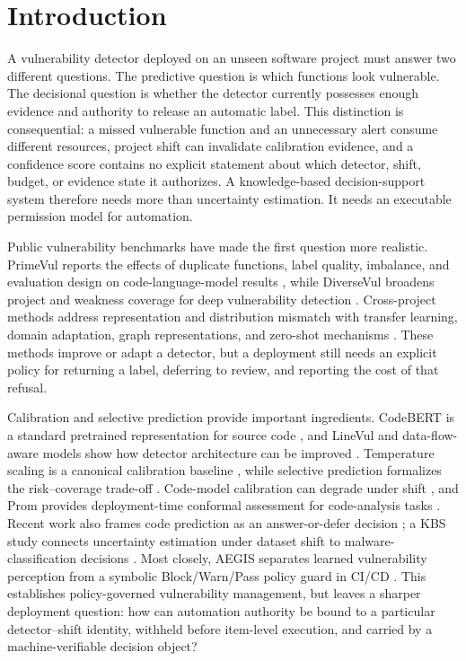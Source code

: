 \documentclass[preprint,12pt]{elsarticle}
\begin{document}
\section{Introduction}

A vulnerability detector deployed on an unseen software project must answer two different questions. The predictive question is which functions look vulnerable. The decisional question is whether the detector currently possesses enough evidence and authority to release an automatic label. This distinction is consequential: a missed vulnerable function and an unnecessary alert consume different resources, project shift can invalidate calibration evidence, and a confidence score contains no explicit statement about which detector, shift, budget, or evidence state it authorizes. A knowledge-based decision-support system therefore needs more than uncertainty estimation. It needs an executable permission model for automation.

Public vulnerability benchmarks have made the first question more realistic. PrimeVul reports the effects of duplicate functions, label quality, imbalance, and evaluation design on code-language-model results \cite{ding2025primevul}, while DiverseVul broadens project and weakness coverage for deep vulnerability detection \cite{chen2023diversevul}. Cross-project methods address representation and distribution mismatch with transfer learning, domain adaptation, graph representations, and zero-shot mechanisms \cite{lin2018transfer,liu2022cdvuld,zhang2023cpvd,nguyen2024dam2p,cai2024csvdtf,haque2026zsvuld}. These methods improve or adapt a detector, but a deployment still needs an explicit policy for returning a label, deferring to review, and reporting the cost of that refusal.

Calibration and selective prediction provide important ingredients. CodeBERT is a standard pretrained representation for source code \cite{feng2020codebert}, and LineVul and data-flow-aware models show how detector architecture can be improved \cite{fu2022linevul,steenhoek2024deepdfa}. Temperature scaling is a canonical calibration baseline \cite{guo2017calibration}, while selective prediction formalizes the risk--coverage trade-off \cite{geifman2019selectivenet}. Code-model calibration can degrade under shift \cite{zhou2024calibration}, and Prom provides deployment-time conformal assessment for code-analysis tasks \cite{wang2025prom}. Recent work also frames code prediction as an answer-or-defer decision \cite{rathnasuriya2026defer}; a KBS study connects uncertainty estimation under dataset shift to malware-classification decisions \cite{yumlembam2026kbs}. Most closely, AEGIS separates learned vulnerability perception from a symbolic Block/Warn/Pass policy guard in CI/CD \cite{abdallah2026aegis}. This establishes policy-governed vulnerability management, but leaves a sharper deployment question: how can automation authority be bound to a particular detector--shift identity, withheld before item-level execution, and carried by a machine-verifiable decision object?
\end{document}
